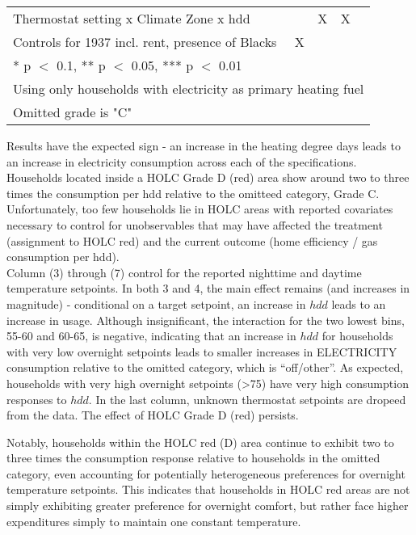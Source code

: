 \documentclass[
]{article}
\begin{document}
\begin{table}
{\begin{tabular}[t]{lccc>{}c}
Thermostat setting x Climate Zone x hdd &  & X & X & \cellcolor{blue}{\textcolor{white}{X}}\\
Controls for 1937 incl. rent, presence of Blacks & X &  &  & \cellcolor{blue}{\textcolor{white}{X}}\\
\bottomrule
\multicolumn{5}{l}{\textsuperscript{} * p $<$ 0.1, ** p $<$ 0.05, *** p $<$ 0.01}\\
\multicolumn{5}{l}{\textsuperscript{} Using only households with electricity as primary heating fuel}\\
\multicolumn{5}{l}{\textsuperscript{} Omitted grade is "C"}\\
\end{tabular}}
\end{table}

Results have the expected sign - an increase in the heating degree days leads to an increase in electricity consumption across each of the specifications.
Households located inside a HOLC Grade D (red) area show around two to three times the consumption per hdd relative to the omitteed category, Grade C.
Unfortunately, too few households lie in HOLC areas with reported covariates necessary to control
for unobservables that may have affected the treatment (assignment to HOLC red) and the current outcome (home efficiency / gas consumption per hdd).\\
Column (3) through (7) control for the reported nighttime and daytime temperature setpoints. In both 3 and 4, the main effect remains (and increases in magnitude) - conditional on a target setpoint,
an increase in \(hdd\) leads to an increase in usage.
Although insignificant, the interaction for the two lowest bins, 55-60 and 60-65, is negative, indicating that an increase in \(hdd\) for households with very low overnight setpoints
leads to smaller increases in ELECTRICITY consumption relative to the omitted category, which is ``off/other''. As expected, households with very high overnight setpoints (\textgreater75) have very high
consumption responses to \(hdd\). In the last column, unknown thermostat setpoints are dropeed from the data. The effect of HOLC Grade D (red) persists.

Notably, households within the HOLC red (D) area continue to exhibit two to three times the consumption response relative to households in the omitted category, even accounting for
potentially heterogeneous preferences for overnight temperature setpoints. This indicates that households in HOLC red areas are not simply exhibiting greater preference
for overnight comfort, but rather face higher expenditures simply to maintain one constant temperature.
\end{document}
